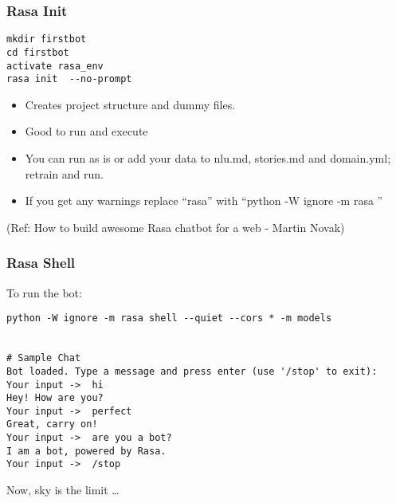 





 \begin{frame}[fragile]\frametitle{Rasa Init}

\begin{lstlisting}
mkdir firstbot
cd firstbot
activate rasa_env
rasa init  --no-prompt
\end{lstlisting}

\begin{itemize}
\item Creates project structure and dummy files. 
\item Good to run and execute
\item You can run as is or add your data to nlu.md, stories.md and domain.yml; retrain and run.
\item If you get any warnings replace ``rasa'' with ``python -W ignore -m rasa ''
\end{itemize}

{\tiny (Ref: How to build awesome Rasa chatbot for a web - Martin Novak)}

\end{frame}

 \begin{frame}[fragile]\frametitle{Rasa Shell}

To run the bot:

\begin{lstlisting}
python -W ignore -m rasa shell --quiet --cors * -m models 


# Sample Chat
Bot loaded. Type a message and press enter (use '/stop' to exit):
Your input ->  hi
Hey! How are you?
Your input ->  perfect
Great, carry on!
Your input ->  are you a bot?
I am a bot, powered by Rasa.
Your input ->  /stop
\end{lstlisting}

Now, sky is the limit \ldots
\end{frame}



